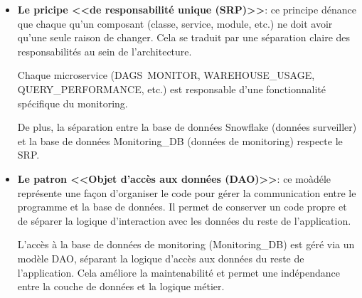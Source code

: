 \begin{itemize}
    \item \textbf{Le pricipe <<de responsabilité unique (SRP)>>}: ce principe dénance que chaque qu'un composant (classe, service, module, etc.) ne doit avoir qu'une seule raison de changer. 
    Cela se traduit par une séparation claire des responsabilités au sein de l'architecture\cite{SRP}.
    \par Chaque microservice (DAGS\ MONITOR, WAREHOUSE\_USAGE, QUERY\_PERFORMANCE, etc.) est responsable d'une fonctionnalité spécifique du monitoring.
   \par De plus, la séparation entre la base de données Snowflake (données surveiller) et la base de données Monitoring\_DB (données de monitoring) respecte le SRP.
    \item \textbf{Le patron <<Objet d'accès aux données (DAO)>>}: ce moàdéle représente une façon d'organiser le code pour gérer la communication entre le programme et la base de données.
    Il permet de conserver un code propre et de séparer la logique d'interaction avec les données du reste de l'application\cite{DAO}.
    \par L'accès à la base de données de monitoring (Monitoring\_DB) est géré via un modèle DAO, séparant la logique d'accès aux données du reste de l'application.
    Cela améliore la maintenabilité et permet une indépendance entre la couche de données et la logique métier.
\end{itemize}

